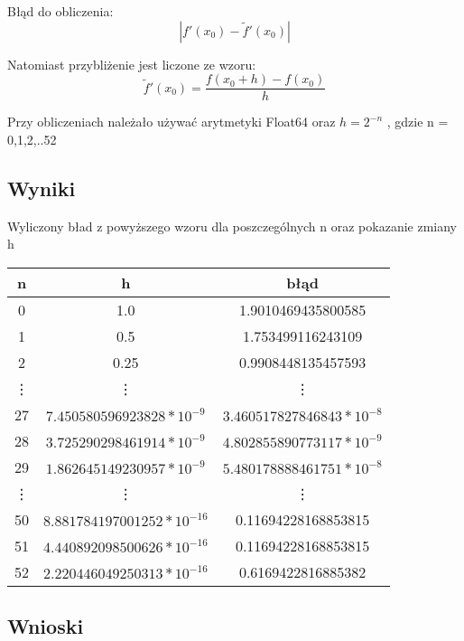 \documentclass[12pt, a4paper]{article}
\begin{document}
 Błąd do obliczenia:
\[|f'(x_{0}) - \widetilde{f}'(x_{0})|\]

Natomiast przybliżenie jest liczone ze wzoru:
\[\widetilde{f}'(x_{0}) = \frac{f(x_{0} + h) - f(x_{0})}{h}\]

Przy obliczeniach należało używać arytmetyki Float64 oraz $h = 2^{-n}$ , gdzie n = 0,1,2,..52
\subsection{Wyniki}
Wyliczony bład z powyższego wzoru dla poszczególnych n oraz pokazanie zmiany h
\begin{center}
  \begin{tabular}{c|c|c}
    n & h & błąd  \\
    \hline
    0 & 1.0 & 1.9010469435800585\\
    1 & 0.5 & 1.753499116243109\\
    2 & 0.25 & 0.9908448135457593\\
    \vdots \qquad & \vdots \qquad & \vdots \qquad \\
    27 & $7.450580596923828 * 10^{-9}$ & $3.460517827846843 * 10^{-8}$\\
    28 & $3.725290298461914 * 10^{-9}$ & $4.802855890773117 * 10^{-9}$\\
    29 & $1.862645149230957 * 10^{-9}$ & $5.480178888461751 * 10^{-8}$\\
    \vdots \qquad & \vdots \qquad & \vdots \qquad \\
    50 & $8.881784197001252 * 10^{-16}$ & 0.11694228168853815\\
    51 & $4.440892098500626 * 10^{-16}$ & 0.11694228168853815\\
    52 & $2.220446049250313 * 10^{-16}$ & 0.6169422816885382
  \end{tabular}
\end{center}
\subsection{Wnioski}
\end{document}
